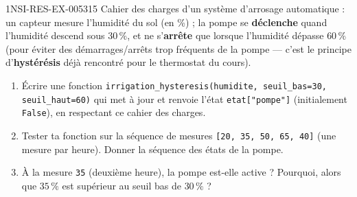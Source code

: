 \begin{exercice}{1NSI-RES-EX-005}{3}{15}
Cahier des charges d'un système d'arrosage automatique : un capteur mesure l'humidité du
sol (en \%) ; la pompe se \textbf{déclenche} quand l'humidité descend sous $30\,\%$, et ne
s'\textbf{arrête} que lorsque l'humidité dépasse $60\,\%$ (pour éviter des démarrages/arrêts
trop fréquents de la pompe — c'est le principe d'\textbf{hystérésis} déjà rencontré pour le
thermostat du cours).
\begin{enumerate}
  \item Écrire une fonction \lstinline{irrigation_hysteresis(humidite, seuil_bas=30, seuil_haut=60)} qui met à jour et renvoie l'état \lstinline{etat["pompe"]} (initialement \lstinline{False}), en respectant ce cahier des charges.
  \item Tester ta fonction sur la séquence de mesures \lstinline{[20, 35, 50, 65, 40]} (une mesure par heure). Donner la séquence des états de la pompe.
  \item À la mesure \lstinline{35} (deuxième heure), la pompe est-elle active ? Pourquoi, alors que $35\,\%$ est supérieur au seuil bas de $30\,\%$ ?
\end{enumerate}
\end{exercice}
